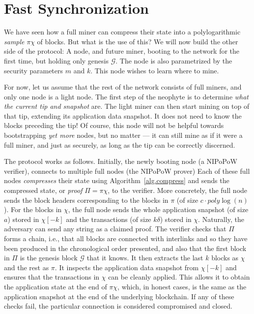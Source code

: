 \section{Fast Synchronization}

We have seen how a full miner can compress their state
into a polylogarithmic \emph{sample} $\pi\chi$ of blocks.
But what is the use of this? We will now build the other
side of the protocol: A node, and future miner, booting to
the network for the first time, but holding only genesis
$\mathcal{G}$. The node is also parametrized by the security
parameters $m$ and $k$. This node wishes to learn where to mine.

For now, let us
assume that the rest of the network consists of full miners,
and only one node is a light node. The first step of the neophyte
is to determine \emph{what the current tip and snapshot} are.
The light miner can then start mining on top of that tip, extending
its application data snapshot. It does not need to know
the blocks preceding the tip! Of course, this node will not be
helpful towards bootstrapping \emph{yet more} nodes, but no
matter --- it can still mine as if it were a full miner,
and just as securely, as long as the tip can be correctly discerned.

The protocol works as follows. Initially, the newly booting
node (a NIPoPoW verifier),
connects to multiple full nodes (the NIPoPoW prover)
Each of these full nodes \emph{compresses} their state using
Algorithm~\ref{alg.compress} and sends the compressed state, or \emph{proof} $\Pi = \pi\chi$,
to the verifier. More concretely, the full node sends the block headers
corresponding to the blocks in $\pi$ (of size $c \cdot poly\log(n)$). For the blocks in $\chi$, the full
node sends the whole application snapshot (of size $a$) stored in $\chi[-k]$ and the
transactions (of size $k\delta$) stored in $\chi$.
Naturally, the adversary can send any string as a claimed proof.
The verifier checks that $\Pi$ forms a chain,
i.e., that all blocks are connected with interlinks and so they have
been produced in the chronological order presented, and also that
the first block in $\Pi$ is the genesis block $\mathcal{G}$ that it knows.
It then extracts the last $k$ blocks as $\chi$ and the rest as $\pi$.
It inspects the application data snapshot from $\chi[-k]$
and ensures that the transactions in $\chi$ can be cleanly applied.
This allows it to obtain the application state at the end of $\pi\chi$,
which, in honest cases, is the same as the application snapshot at
the end of the underlying blockchain.
If any of these checks
fail, the particular connection is considered compromised and closed.

